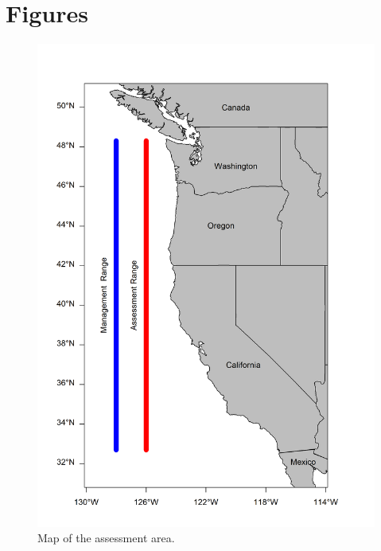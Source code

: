 \documentclass[11pt,
  english,
  a4paper,
]{article}
\begin{document}
\endgroup{}

\clearpage


\hypertarget{figures}{%
\section{Figures}\label{figures}}

\leavevmode\tagmcend\tagstructend


\begin{figure}
\centering
\includegraphics[width=1\textwidth,height=1\textheight]{figs/map.png}
\caption{Map of the assessment area.\label{fig:map}}
\end{figure}
\end{document}

